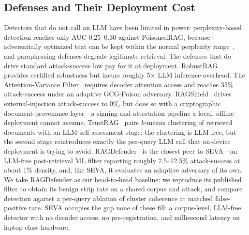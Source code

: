 \documentclass[10pt,journal,compsoc]{IEEEtran}
\begin{document}
\subsection{Defenses and Their Deployment Cost}
Detectors that do not call an LLM have been limited in power: perplexity-based
detection reaches only AUC 0.25--0.30 against PoisonedRAG, because adversarially
optimized text can be kept within the normal perplexity
range~\cite{poisonedrag}, and paraphrasing defenses degrade legitimate
retrieval. The defenses that do drive standard attack-success low pay for it at
deployment. RobustRAG~\cite{robustrag} provides certified robustness but incurs
roughly 5$\times$ LLM inference overhead. The Attention-Variance
Filter~\cite{avfilter} requires decoder attention access and reaches 35\%
attack-success under an adaptive GCG-Poison adversary. RAGShield~\cite{ragshield}
drives external-injection attack-success to 0\%, but does so with a cryptographic
document-provenance layer---a signing-and-attestation pipeline a local, offline deployment
cannot assume.
TrustRAG~\cite{trustrag} pairs $k$-means clustering of retrieved documents with an
LLM self-assessment stage: the clustering is LLM-free, but the second stage
reintroduces exactly the per-query LLM call that on-device deployment is trying to
avoid. RAGDefender~\cite{ragdefender} is the closest peer to SEVA---an LLM-free
post-retrieval ML filter reporting roughly 7.5--12.5\% attack-success at about
1\% density, and, like SEVA, it evaluates an adaptive adversary of its own. We
take RAGDefender as our head-to-head baseline: we reproduce its published filter to obtain
its benign strip rate on a shared corpus and attack, and compare detection against a per-query
ablation of cluster coherence at matched false-positive rate.
SEVA occupies the gap none of these fill: a corpus-level, LLM-free detector with
no decoder access, no pre-registration, and millisecond latency on laptop-class
hardware.
\end{document}
